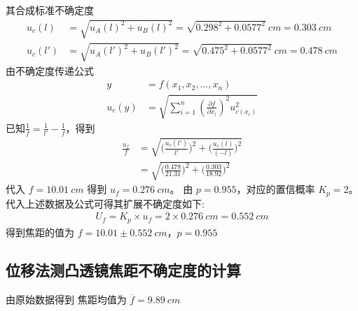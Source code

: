 \documentclass[UTF8]{ctexart}
\begin{document}
其合成标准不确定度
\begin{align*}
    u_c(l) &= \sqrt{u_A(l)^2+u_B(l)^2} = \sqrt{0.298^2 + 0.0577^2} \ cm  = 0.303 \ cm \\
    u_c(l') &= \sqrt{u_A(l')^2+u_B(l')^2} = \sqrt{0.475^2 + 0.0577^2} \ cm = 0.478 \ cm
\end{align*}
由不确定度传递公式
\begin{align*}
    y &= f(x_1,x_2,\dots,x_n) \\
    u_c(y) &= \sqrt{\sum_{i=1}^{n}(\frac{\partial f}{\partial x_i})^2 u^2_{c(x_i)}}
\end{align*}
已知$\frac{1}{f} = \frac{1}{l'} - \frac{1}{f}$，得到 
\begin{align*}
    \frac{u_f}{f} &= \sqrt{ \Big(  \frac{u_c(l')}{l'}  \Big)^2 +
    \Big(  \frac{u_c(l)}{(-l)}  \Big)^2 } \\
    &=  \sqrt{ \Big(  \frac{0.478}{21.31}  \Big)^2 +
    \Big(  \frac{0.303}{18.92}  \Big)^2 } 
\end{align*}
代入 $ f = 10.01 \ cm$ 得到 $ u_f = 0.276 \ cm$。
由 $p=0.955$，对应的置信概率 $K_p=2$。代入上述数据及公式可得其扩展不确定度如下:
\begin{align*}
    U_f = K_p \times u_f = 2 \times 0.276 \ cm = 0.552 \ cm 
\end{align*}
得到焦距的值为 $f = 10.01 \pm 0.552 \ cm$，$p = 0.955$

\subsection{位移法测凸透镜焦距不确定度的计算}
由原始数据得到 焦距均值为 $\overline{f} = 9.89 \ cm$
\end{document}
